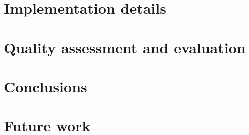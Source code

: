 \documentclass[]{usiinfbachelorproject}
\begin{document}
\TODO{}

\section{Implementation details} \label{implementation}

\TODO{}


\section{Quality assessment and evaluation} \label{evaluation}

\TODO{}

\section{Conclusions} \label{conclusions}

\TODO{}

\section{Future work} \label{futureWork}

\TODO{}



\newpage



\end{document}
